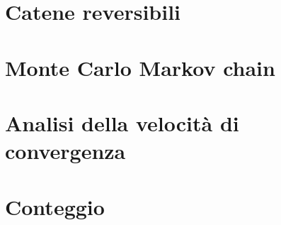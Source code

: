 \chapter{Catene reversibili}



\chapter{Monte Carlo Markov chain}

\clearpage


\clearpage


\chapter{Analisi della velocità di convergenza}



\chapter{Conteggio}




